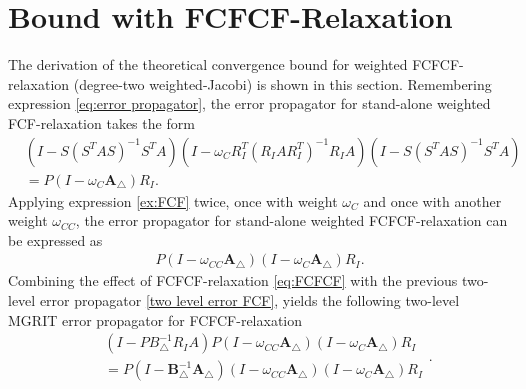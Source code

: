 \documentclass[VANCOUVER,STIX1COL]{WileyNJD-v2}
\begin{document}


%


\appendix

\section{Bound with FCFCF-Relaxation} \label{app1}
The derivation of the theoretical convergence bound for weighted FCFCF-relaxation (degree-two weighted-Jacobi) is shown in this section.
%
Remembering expression \eqref{eq:error propagator}, the error propagator for stand-alone weighted FCF-relaxation takes the form
\begin{equation} \label{ex:FCF}
\begin{aligned}
&(I-S(S^TAS)^{-1}S^TA)(I-\omega_C R^T_I(R_IAR^T_I)^{-1}R_IA)(I-S(S^TAS)^{-1}S^TA)\\
&= P(I - \omega_C \mathbf{A}_{\triangle})R_I .
\end{aligned}
\end{equation}
Applying expression \eqref{ex:FCF} twice, once with weight $\omega_C$ and once with another weight $\omega_{CC}$, the error propagator for stand-alone weighted FCFCF-relaxation can be expressed as
\begin{equation}
\begin{aligned} \label{eq:FCFCF}
P(I - \omega_{CC} \mathbf{A}_{\triangle})(I - \omega_C \mathbf{A}_{\triangle})R_I .
\end{aligned}
\end{equation}
Combining the effect of FCFCF-relaxation \eqref{eq:FCFCF} with the previous two-level error propagator \eqref{two level error FCF}, yields the following two-level MGRIT error propagator for FCFCF-relaxation
\begin{equation}
\begin{aligned}
&(I-PB^{-1}_{\triangle}R_IA) P(I - \omega_{CC} \mathbf{A}_{\triangle})(I - \omega_C \mathbf{A}_{\triangle})R_I \\
&= P(I-\mathbf{B}_{\triangle}^{-1}\mathbf{A}_{\triangle})(I - \omega_{CC} \mathbf{A}_{\triangle})(I - \omega_C \mathbf{A}_{\triangle})R_I
\end{aligned}.
\end{equation}
\end{document}
